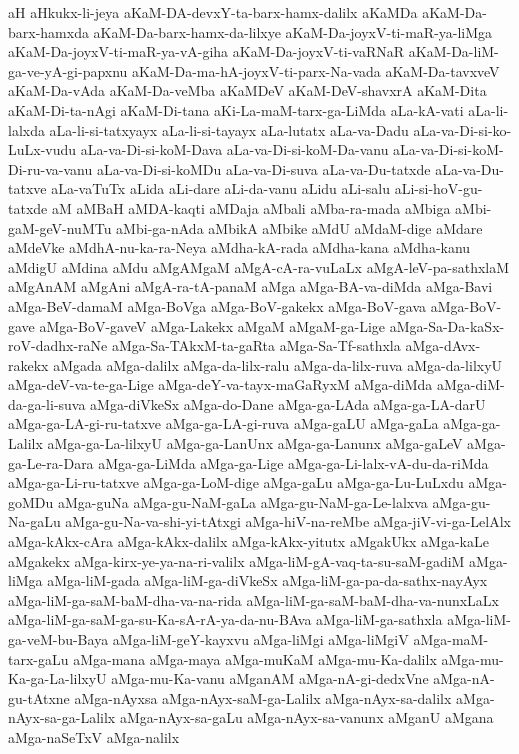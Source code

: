 {aH
aHkukx-li-jeya
aKaM-DA-devxY-ta-barx-hamx-dalilx
aKaMDa
aKaM-Da-barx-hamxda
aKaM-Da-barx-hamx-da-lilxye
aKaM-Da-joyxV-ti-maR-ya-liMga
aKaM-Da-joyxV-ti-maR-ya-vA-giha
aKaM-Da-joyxV-ti-vaRNaR
aKaM-Da-liM-ga-ve-yA-gi-papxnu
aKaM-Da-ma-hA-joyxV-ti-parx-Na-vada
aKaM-Da-tavxveV
aKaM-Da-vAda
aKaM-Da-veMba
aKaMDeV
aKaM-DeV-shavxrA
aKaM-Dita
aKaM-Di-ta-nAgi
aKaM-Di-tana
aKi-La-maM-tarx-ga-LiMda
aLa-kA-vati
aLa-li-lalxda
aLa-li-si-tatxyayx
aLa-li-si-tayayx
aLa-lutatx
aLa-va-Dadu
aLa-va-Di-si-ko-LuLx-vudu
aLa-va-Di-si-koM-Dava
aLa-va-Di-si-koM-Da-vanu
aLa-va-Di-si-koM-Di-ru-va-vanu
aLa-va-Di-si-koMDu
aLa-va-Di-suva
aLa-va-Du-tatxde
aLa-va-Du-tatxve
aLa-vaTuTx
aLida
aLi-dare
aLi-da-vanu
aLidu
aLi-salu
aLi-si-hoV-gu-tatxde
aM
aMBaH
aMDA-kaqti
aMDaja
aMbali
aMba-ra-mada
aMbiga
aMbi-gaM-geV-nuMTu
aMbi-ga-nAda
aMbikA
aMbike
aMdU
aMdaM-dige
aMdare
aMdeVke
aMdhA-nu-ka-ra-Neya
aMdha-kA-rada
aMdha-kana
aMdha-kanu
aMdigU
aMdina
aMdu
aMgAMgaM
aMgA-cA-ra-vuLaLx
aMgA-leV-pa-sathxlaM
aMgAnAM
aMgAni
aMgA-ra-tA-panaM
aMga
aMga-BA-va-diMda
aMga-Bavi
aMga-BeV-damaM
aMga-BoVga
aMga-BoV-gakekx
aMga-BoV-gava
aMga-BoV-gave
aMga-BoV-gaveV
aMga-Lakekx
aMgaM
aMgaM-ga-Lige
aMga-Sa-Da-kaSx-roV-dadhx-raNe
aMga-Sa-TAkxM-ta-gaRta
aMga-Sa-Tf-sathxla
aMga-dAvx-rakekx
aMgada
aMga-dalilx
aMga-da-lilx-ralu
aMga-da-lilx-ruva
aMga-da-lilxyU
aMga-deV-va-te-ga-Lige
aMga-deY-va-tayx-maGaRyxM
aMga-diMda
aMga-diM-da-ga-li-suva
aMga-diVkeSx
aMga-do-Dane
aMga-ga-LAda
aMga-ga-LA-darU
aMga-ga-LA-gi-ru-tatxve
aMga-ga-LA-gi-ruva
aMga-gaLU
aMga-gaLa
aMga-ga-Lalilx
aMga-ga-La-lilxyU
aMga-ga-LanUnx
aMga-ga-Lanunx
aMga-gaLeV
aMga-ga-Le-ra-Dara
aMga-ga-LiMda
aMga-ga-Lige
aMga-ga-Li-lalx-vA-du-da-riMda
aMga-ga-Li-ru-tatxve
aMga-ga-LoM-dige
aMga-gaLu
aMga-ga-Lu-LuLxdu
aMga-goMDu
aMga-guNa
aMga-gu-NaM-gaLa
aMga-gu-NaM-ga-Le-lalxva
aMga-gu-Na-gaLu
aMga-gu-Na-va-shi-yi-tAtxgi
aMga-hiV-na-reMbe
aMga-jiV-vi-ga-LelAlx
aMga-kAkx-cAra
aMga-kAkx-dalilx
aMga-kAkx-yitutx
aMgakUkx
aMga-kaLe
aMgakekx
aMga-kirx-ye-ya-na-ri-valilx
aMga-liM-gA-vaq-ta-su-saM-gadiM
aMga-liMga
aMga-liM-gada
aMga-liM-ga-diVkeSx
aMga-liM-ga-pa-da-sathx-nayAyx
aMga-liM-ga-saM-baM-dha-va-na-rida
aMga-liM-ga-saM-baM-dha-va-nunxLaLx
aMga-liM-ga-saM-ga-su-Ka-sA-rA-ya-da-nu-BAva
aMga-liM-ga-sathxla
aMga-liM-ga-veM-bu-Baya
aMga-liM-geY-kayxvu
aMga-liMgi
aMga-liMgiV
aMga-maM-tarx-gaLu
aMga-mana
aMga-maya
aMga-muKaM
aMga-mu-Ka-dalilx
aMga-mu-Ka-ga-La-lilxyU
aMga-mu-Ka-vanu
aMganAM
aMga-nA-gi-dedxVne
aMga-nA-gu-tAtxne
aMga-nAyxsa
aMga-nAyx-saM-ga-Lalilx
aMga-nAyx-sa-dalilx
aMga-nAyx-sa-ga-Lalilx
aMga-nAyx-sa-gaLu
aMga-nAyx-sa-vanunx
aMganU
aMgana
aMga-naSeTxV
aMga-nalilx
}
